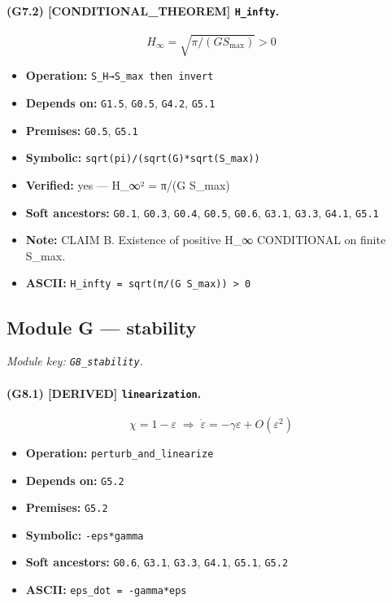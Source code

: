 \documentclass[11pt,a4paper]{article}
\theoremstyle{remark}\newtheorem*{caution}{Caution}
\newcommand{\tagbox}[1]{\textsc{[#1]}}
\begin{document}
\paragraph{(G7.2) \tagbox{CONDITIONAL\_THEOREM} \texttt{H\_infty}.}
\begin{equation}
H_\infty=\sqrt{\pi/(G S_{\max})}>0
\tag{G7.2}
\end{equation}
\begin{itemize}\setlength{\itemsep}{0.12em}
\item \textbf{Operation:} \texttt{S\_H→S\_max then invert}
\item \textbf{Depends on:} \texttt{G1.5}, \texttt{G0.5}, \texttt{G4.2}, \texttt{G5.1}
\item \textbf{Premises:} \texttt{G0.5}, \texttt{G5.1}
\item \textbf{Symbolic:} \texttt{sqrt(pi)/(sqrt(G)*sqrt(S\_max))}
\item \textbf{Verified:} yes --- H\_∞² = π/(G S\_max)
\item \textbf{Soft ancestors:} \texttt{G0.1}, \texttt{G0.3}, \texttt{G0.4}, \texttt{G0.5}, \texttt{G0.6}, \texttt{G3.1}, \texttt{G3.3}, \texttt{G4.1}, \texttt{G5.1}
\item \textbf{Note:} CLAIM B. Existence of positive H\_∞ CONDITIONAL on finite S\_max.
\item \textbf{ASCII:} \texttt{H\_infty = sqrt(π/(G S\_max)) > 0}
\end{itemize}
\subsection{Module G --- stability}
\textit{Module key: \texttt{G8\_stability}.}
\paragraph{(G8.1) \tagbox{DERIVED} \texttt{linearization}.}
\begin{equation}
\chi=1-\varepsilon\;\Rightarrow\;\dot\varepsilon=-\gamma\varepsilon+O(\varepsilon^2)
\tag{G8.1}
\end{equation}
\begin{itemize}\setlength{\itemsep}{0.12em}
\item \textbf{Operation:} \texttt{perturb\_and\_linearize}
\item \textbf{Depends on:} \texttt{G5.2}
\item \textbf{Premises:} \texttt{G5.2}
\item \textbf{Symbolic:} \texttt{-eps*gamma}
\item \textbf{Soft ancestors:} \texttt{G0.6}, \texttt{G3.1}, \texttt{G3.3}, \texttt{G4.1}, \texttt{G5.1}, \texttt{G5.2}
\item \textbf{ASCII:} \texttt{eps\_dot = -gamma*eps}
\end{itemize}
\end{document}
